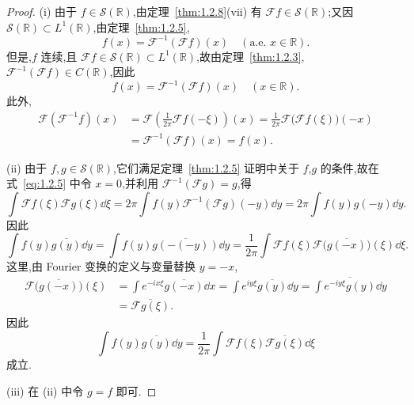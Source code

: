 \begin{proof}
(i) 由于 $f \in \mathcal{S}(\mathbb{R})$,由定理~\ref{thm:1.2.8}(vii) 有 $\mathcal{F}f \in \mathcal{S}(\mathbb{R})$;又因 $\mathcal{S}(\mathbb{R}) \subset L^{1}(\mathbb{R})$,由定理~\ref{thm:1.2.5},
\begin{equation*}
f(x) = \mathcal{F}^{-1}(\mathcal{F}f)(x) \quad (\text{a.e. } x \in \mathbb{R}).
\end{equation*}
但是,$f$ 连续,且 $\mathcal{F}f \in \mathcal{S}(\mathbb{R}) \subset L^{1}(\mathbb{R})$,故由定理~\ref{thm:1.2.3},$\mathcal{F}^{-1}(\mathcal{F}f) \in C(\mathbb{R})$,因此
\begin{equation*}
f(x) = \mathcal{F}^{-1}(\mathcal{F}f)(x) \quad (x \in \mathbb{R}).
\end{equation*}
此外,
\begin{align*}
\mathcal{F}(\mathcal{F}^{-1}f)(x) & = \mathcal{F}\left(\frac{1}{2\pi}\mathcal{F}f(-\xi)\right)(x) = \frac{1}{2\pi}\mathcal{F}\bigl(\mathcal{F}f(\xi)\bigr)(-x) \\
& = \mathcal{F}^{-1}(\mathcal{F}f)(x) = f(x).
\end{align*}

(ii) 由于 $f, g \in \mathcal{S}(\mathbb{R})$,它们满足定理~\ref{thm:1.2.5} 证明中关于 $f$,$g$ 的条件,故在式~\eqref{eq:1.2.5} 中令 $x = 0$,并利用 $\mathcal{F}^{-1}(\mathcal{F}g) = g$,得
\begin{equation*}
\int\mathcal{F}f(\xi)\mathcal{F}g(\xi)\dd \xi = 2\pi\int f(y)\mathcal{F}^{-1}(\mathcal{F}g)(-y)\dd y = 2\pi\int f(y)g(-y)\dd y.
\end{equation*}
因此
\begin{equation*}
\int f(y)\overline{g(y)}\dd y = \int f(y)\overline{g(-(-y))}\dd y = \frac{1}{2\pi}\int\mathcal{F}f(\xi)\mathcal{F}\bigl(\overline{g(-x)}\bigr)(\xi)\dd \xi.
\end{equation*}
这里,由 Fourier 变换的定义与变量替换 $y = -x$,
\begin{align*}
\mathcal{F}\bigl(\overline{g(-x)}\bigr)(\xi) &= \int e^{-ix\xi}\overline{g(-x)}\dd x = \int e^{iy\xi}\overline{g(y)}\dd y = \overline{\int e^{-iy\xi}g(y)\dd y} \\
&= \overline{\mathcal{F}g(\xi)}.
\end{align*}
因此
\begin{equation*}
\int f(y)\overline{g(y)}\dd y = \frac{1}{2\pi}\int\mathcal{F}f(\xi)\overline{\mathcal{F}g(\xi)}\dd \xi
\end{equation*}
成立.

(iii) 在 (ii) 中令 $g = f$ 即可.
\end{proof}

